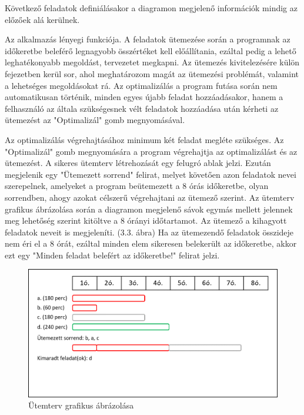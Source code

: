 Következő feladatok definiálásakor a diagramon megjelenő információk mindig az előzőek alá kerülnek.


Az alkalmazás lényegi funkciója. A feladatok ütemezése során a programnak az időkeretbe beleférő legnagyobb összértéket kell előállítania, ezáltal pedig a lehető leghatékonyabb megoldást, tervezetet megkapni. Az ütemezés kivitelezésére külön fejezetben kerül sor, ahol meghatározom magát az ütemezési problémát, valamint a lehetséges megoldásokat rá. Az optimalizálás a program futása során nem automatikusan történik, minden egyes újabb feladat hozzáadásakor, hanem a felhasználó az általa szükségesnek vélt feladatok hozzáadása után kérheti az ütemezést az "Optimalizál" gomb megnyomásával.

Az optimalizálás végrehajtásához minimum két feladat megléte szükséges. Az "Optimalizál" gomb megnyomására a program végrehajtja az optimalizálást és az ütemezést. A sikeres ütemterv létrehozását egy felugró ablak jelzi. Ezután megjelenik egy "Ütemezett sorrend" felirat, melyet követően azon feladatok nevei szerepelnek, amelyeket a program beütemezett a 8 órás időkeretbe, olyan sorrendben, ahogy azokat célszerű végrehajtani az ütemező szerint. Az ütemterv grafikus ábrázolása során a diagramon megjelenő sávok egymás mellett jelennek meg lehetőség szerint kitöltve a 8 órányi időtartamot. Az ütemező a kihagyott feladatok neveit is megjeleníti. (3.3. ábra) Ha az ütemezendő feladatok összideje nem éri el a 8 órát, ezáltal minden elem sikeresen belekerült az időkeretbe, akkor ezt egy "Minden feladat belefért az időkeretbe!" felirat jelzi.

\begin{figure}[h]
	\centering
	\includegraphics[scale=0.8]{images/scheduledTasks.png}
	\caption{Ütemterv grafikus ábrázolása}
\end{figure}
